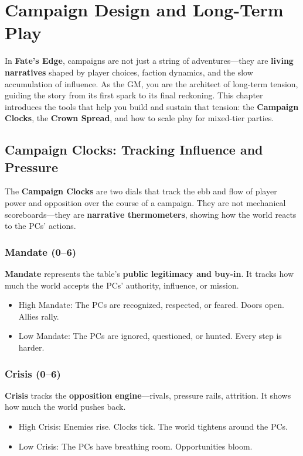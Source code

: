\chapter{Campaign Design and Long-Term Play}

In \textbf{Fate’s Edge}, campaigns are not just a string of adventures—they are \textbf{living narratives} shaped by player choices, faction dynamics, and the slow accumulation of influence. As the GM, you are the architect of long-term tension, guiding the story from its first spark to its final reckoning. This chapter introduces the tools that help you build and sustain that tension: the \textbf{Campaign Clocks}, the \textbf{Crown Spread}, and how to scale play for mixed-tier parties.

\section*{Campaign Clocks: Tracking Influence and Pressure}

The \textbf{Campaign Clocks} are two dials that track the ebb and flow of player power and opposition over the course of a campaign. They are not mechanical scoreboards—they are \textbf{narrative thermometers}, showing how the world reacts to the PCs’ actions.

\subsection*{Mandate (0–6)}

\textbf{Mandate} represents the table’s \textbf{public legitimacy and buy-in}. It tracks how much the world accepts the PCs’ authority, influence, or mission.

\begin{itemize}
    \item High Mandate: The PCs are recognized, respected, or feared. Doors open. Allies rally.
    \item Low Mandate: The PCs are ignored, questioned, or hunted. Every step is harder.
\end{itemize}

\subsection*{Crisis (0–6)}

\textbf{Crisis} tracks the \textbf{opposition engine}—rivals, pressure rails, attrition. It shows how much the world pushes back.

\begin{itemize}
    \item High Crisis: Enemies rise. Clocks tick. The world tightens around the PCs.
    \item Low Crisis: The PCs have breathing room. Opportunities bloom.
\end{itemize}

